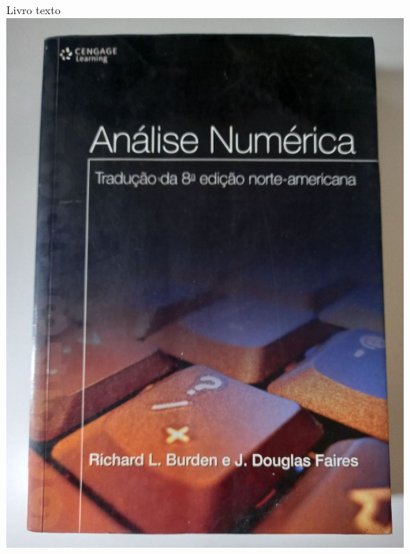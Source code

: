 \begin{frame}{Livro texto}
    \centering
    \includegraphics[height=0.8\textheight]{images/livro_burden.jpg}

\end{frame}
